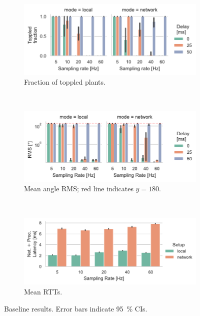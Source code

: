 \begin{figure}[t]
    \centering
    \begin{subfigure}[t]{\columnwidth}
        \centering
        \includegraphics[width=\textwidth]{publications/2022CLEAVE/plots/fixed_single_loop_toppled}
        \caption{Fraction of toppled plants.}\label{fig:single:topple}
    \end{subfigure}\\
    \begin{subfigure}[t]{\columnwidth}
        \centering
        \includegraphics[width=\textwidth]{publications/2022CLEAVE/plots/fixed_single_loop_rms}
        \caption{Mean angle \acs*{RMS}; red line indicates \( y = 180 \).}\label{fig:single:rms}
    \end{subfigure}\\
    \begin{subfigure}[t]{\columnwidth}
        \centering
        \includegraphics[width=\textwidth]{publications/2022CLEAVE/plots/fixed_single_loop_rtts}
        \caption{
            Mean \acsp*{RTT}.
        }\label{fig:single:rtt}
    \end{subfigure}%
    \caption[caption]{
        Baseline results.
        Error bars indicate \SI{95}{\percent} \acp{CI}.
        }%
    \label{fig:single}
\end{figure}

